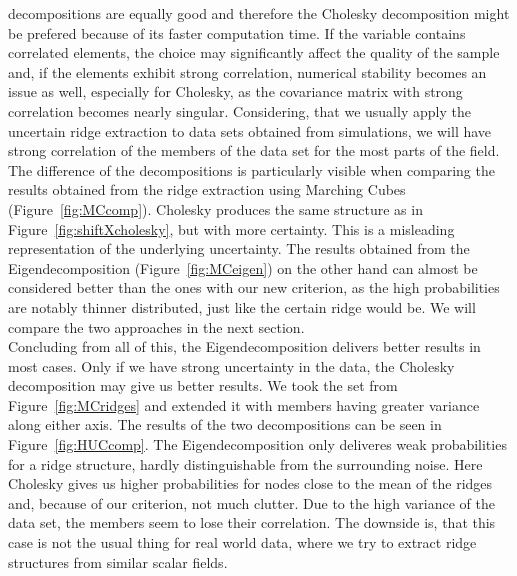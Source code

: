 decompositions are equally good and therefore the Cholesky decomposition
might be prefered because of its faster computation time. If the
variable contains correlated elements, the choice may significantly
affect the quality of the sample and, if the elements exhibit strong
correlation, numerical stability becomes an issue as well, especially
for Cholesky, as the covariance matrix with strong correlation becomes
nearly singular. Considering, that we usually apply the uncertain ridge
extraction to data sets obtained from simulations, we will have strong
correlation of the members of the data set for the most parts of the
field. The difference of the decompositions is particularly visible when
comparing the results obtained from the ridge extraction using Marching
Cubes (Figure~\ref{fig:MCcomp}). Cholesky produces the same structure as
in Figure~\ref{fig:shiftXcholesky}, but with more certainty. This is a
misleading representation of the underlying uncertainty. The results
obtained from the Eigendecomposition (Figure~\ref{fig:MCeigen}) on the
other hand can almost be considered better than the ones with our new
criterion, as the high probabilities are notably thinner distributed,
just like the certain ridge would be. We will compare the two approaches
in the next section.\\
\indent Concluding from all of this, the Eigendecomposition delivers
better results in most cases. Only if we have strong uncertainty in the
data, the Cholesky decomposition may give us better results. We took the
set from Figure~\ref{fig:MCridges} and extended it with members having
greater variance along either axis. The results of the two
decompositions can be seen in Figure~\ref{fig:HUCcomp}. The
Eigendecomposition only deliveres weak probabilities for a ridge
structure, hardly distinguishable from the surrounding noise. Here
Cholesky gives us higher probabilities for nodes close to the mean of
the ridges and, because of our criterion, not much clutter. Due to the
high variance of the data set, the members seem to lose their
correlation. The downside is, that this case is not the usual thing for
real world data, where we try to extract ridge structures from similar
scalar fields. 
